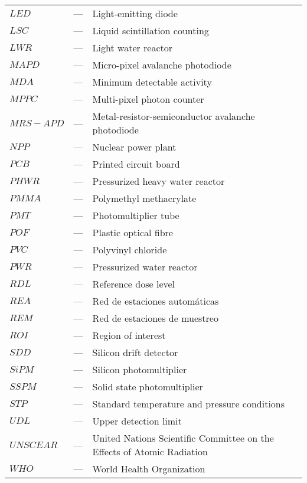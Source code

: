 \begin{longtable}{p{25mm} c p{120mm} }
$LED$ & --- & Light-emitting diode \\
$LSC$ & --- & Liquid scintillation counting\\
$LWR$ & --- & Light water reactor\\
$MAPD$ & --- & Micro-pixel avalanche photodiode\\
$MDA$ & --- & Minimum detectable activity\\
$MPPC$ & --- & Multi-pixel photon counter\\
$MRS-APD$ & --- & Metal-resistor-semiconductor avalanche photodiode\\
$NPP$ & --- & Nuclear power plant\\
$PCB$ & --- & Printed circuit board\\
$PHWR$ & --- & Pressurized heavy water reactor\\
$PMMA$ & --- & Polymethyl methacrylate\\
$PMT$ & --- & Photomultiplier tube\\
$POF$ & --- & Plastic optical fibre\\
$PVC$ & --- & Polyvinyl chloride\\
$PWR$ & --- & Pressurized water reactor\\
$RDL$ & --- & Reference dose level\\
$REA$ & --- & Red de estaciones automáticas\\
$REM$ & --- & Red de estaciones de muestreo\\
$ROI$ & --- & Region of interest\\
$SDD$ & --- & Silicon drift detector\\
$SiPM$ & --- & Silicon photomultiplier\\
$SSPM$ & --- & Solid state photomultiplier\\
$STP$ & --- & Standard temperature and pressure conditions\\
$UDL$ & --- & Upper detection limit\\
$UNSCEAR$ & --- & United Nations Scientific Committee on the Effects
\newline
of Atomic Radiation\\
$WHO$ & --- & World Health Organization\\


\end{longtable}
